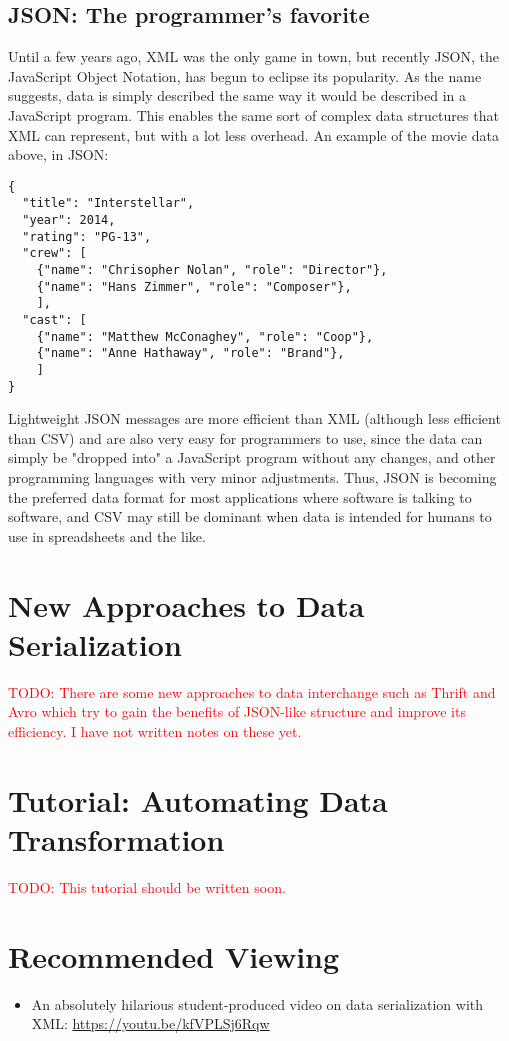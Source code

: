 \documentclass[11pt]{book}
\newcommand{\todo}[1]{\textcolor{red}{TODO: #1}} %
\begin{document}
\subsection{JSON: The programmer's favorite}

Until a few years ago, XML was the only game in town, but recently JSON, the JavaScript Object Notation, has begun to eclipse its popularity.  As the name suggests, data is simply described the same way it would be described in a JavaScript program.  This enables the same sort of complex data structures that XML can represent, but with a lot less overhead.  An example of the movie data above, in JSON:

\begin{verbatim}
{
  "title": "Interstellar",
  "year": 2014,
  "rating": "PG-13",
  "crew": [
    {"name": "Chrisopher Nolan", "role": "Director"},
    {"name": "Hans Zimmer", "role": "Composer"},
    ],
  "cast": [
    {"name": "Matthew McConaghey", "role": "Coop"},
    {"name": "Anne Hathaway", "role": "Brand"},
    ]
}
\end{verbatim}

Lightweight JSON messages are more efficient than XML (although less efficient than CSV) and are also very easy for programmers to use, since the data can simply be "dropped into" a JavaScript program without any changes, and other programming languages with very minor adjustments.  Thus, JSON is becoming the preferred data format for most applications where software is talking to software, and CSV may still be dominant when data is intended for humans to use in spreadsheets and the like.

\section{New Approaches to Data Serialization}
\todo{There are some new approaches to data interchange such as Thrift and Avro which try to gain the benefits of JSON-like structure and improve its efficiency.  I have not written notes on these yet.}

\section{Tutorial: Automating Data Transformation}

\todo{This tutorial should be written soon.} 

\section*{Recommended Viewing}
\begin{itemize}
    \item An absolutely hilarious student-produced video on data serialization with XML: \url{https://youtu.be/kfVPLSj6Rqw}
\end{itemize}
\end{document}

